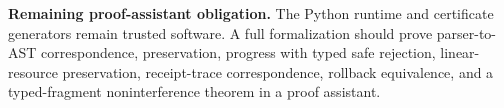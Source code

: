 \begin{placeholderbox}
\textbf{Remaining proof-assistant obligation.} The Python runtime and certificate generators remain trusted software. A full formalization should prove parser-to-AST correspondence, preservation, progress with typed safe rejection, linear-resource preservation, receipt-trace correspondence, rollback equivalence, and a typed-fragment noninterference theorem in a proof assistant.
\end{placeholderbox}
